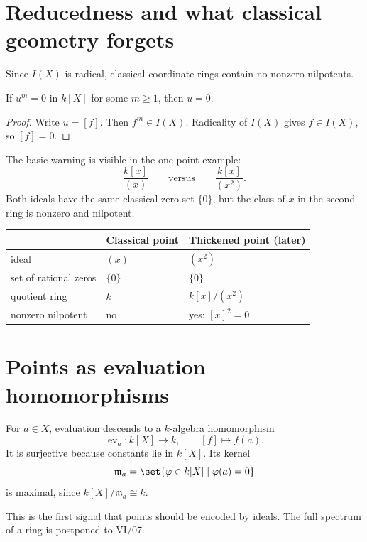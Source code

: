 \section{Reducedness and what classical geometry forgets}
\label{sec:vi03-reducedness}

Since \(I(X)\) is radical, classical coordinate rings contain no nonzero nilpotents.

\begin{proposition}
If \(u^m=0\) in \(k[X]\) for some \(m\ge1\), then \(u=0\).
\end{proposition}

\begin{proof}
Write \(u=[f]\).  Then \(f^m\in I(X)\).  Radicality of \(I(X)\) gives \(f\in I(X)\), so
\([f]=0\).
\end{proof}

The basic warning is visible in the one-point example:
\[
\frac{k[x]}{(x)}\qquad\text{versus}\qquad \frac{k[x]}{(x^2)}.
\]
Both ideals have the same classical zero set \(\{0\}\), but the class of \(x\) in the
second ring is nonzero and nilpotent.

\begin{center}
\begin{tabular}{@{}lll@{}}
\toprule
& \textbf{Classical point} & \textbf{Thickened point (later)}\\
\midrule
ideal & \((x)\) & \((x^2)\)\\
set of rational zeros & \(\{0\}\) & \(\{0\}\)\\
quotient ring & \(k\) & \(k[x]/(x^2)\)\\
nonzero nilpotent & no & yes: \([x]^2=0\)\\
\bottomrule
\end{tabular}
\end{center}

\section{Points as evaluation homomorphisms}
\label{sec:vi03-evaluation}

For \(a\in X\), evaluation descends to a \(k\)-algebra homomorphism
\[
\operatorname{ev}_a:k[X]\to k,
\qquad [f]\mapsto f(a).
\]
It is surjective because constants lie in \(k[X]\).  Its kernel
\[
\mathfrak m_a=\set{\varphi\in k[X]\mid\varphi(a)=0}
\]
is maximal, since \(k[X]/\mathfrak m_a\cong k\).

This is the first signal that points should be encoded by ideals.  The full spectrum of a
ring is postponed to VI/07.


